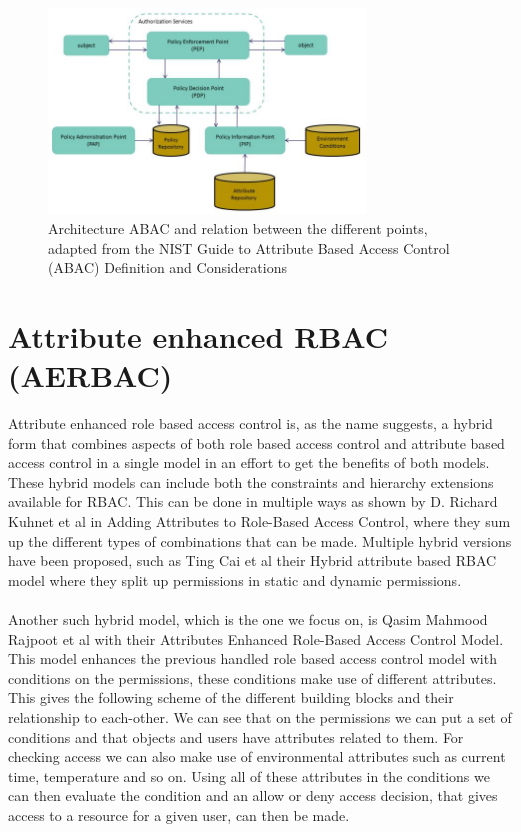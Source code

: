 \begin{figure}[ht]
    \centering
    \includegraphics[width=0.75\textwidth, height=0.40\textwidth]{Img/standard/ABACArchi.JPG}
    \caption{Architecture ABAC and relation between the different points, adapted from the NIST Guide to Attribute Based Access Control (ABAC) Definition and Considerations \cite{ABAC}}
\end{figure}

\section{Attribute enhanced RBAC (AERBAC)}
Attribute enhanced role based access control is, as the name suggests, a hybrid form that combines aspects of both role based access control and attribute based access control in a single model in an effort to get the benefits of both models.
These hybrid models can include both the constraints and hierarchy extensions available for RBAC.
This can be done in multiple ways as shown by D. Richard Kuhnet et al in Adding Attributes to Role-Based Access Control\cite{Combined1}, where they sum up the different types of combinations that can be made.
Multiple hybrid versions have been proposed, such as Ting Cai et al their Hybrid attribute based RBAC model\cite{Combined2} where they split up permissions in static and dynamic permissions.
\\
\\
Another such hybrid model, which is the one we focus on, is Qasim Mahmood Rajpoot et al with their Attributes Enhanced Role-Based Access Control Model\cite{Combined3}.
This model enhances the previous handled role based access control model with conditions on the permissions, these conditions make use of different attributes.
This gives the following scheme of the different building blocks and their relationship to each-other.
We can see that on the permissions we can put a set of conditions and that objects and users have attributes related to them. 
For checking access we can also make use of environmental attributes such as current time, temperature and so on.
Using all of these attributes in the conditions we can then evaluate the condition and an allow or deny access decision, that gives access to a resource for a given user, can then be made.

